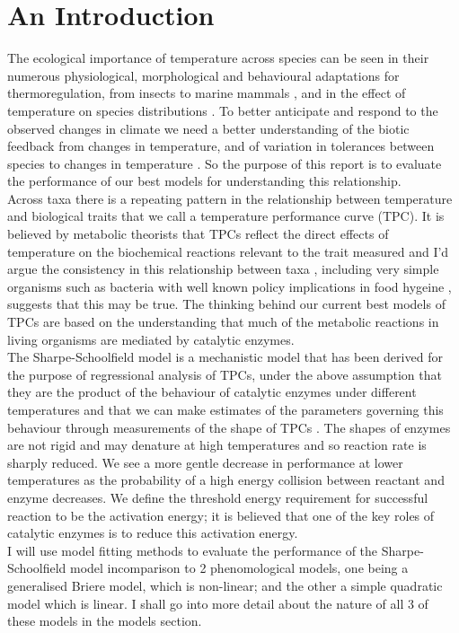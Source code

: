 \documentclass[12pt]{article}
\begin{document}
  \section{An Introduction} 
  The ecological importance of temperature across species can be seen in their numerous physiological, morphological and 
  behavioural adaptations for thermoregulation, from insects to marine mammals \cite{Castellini2018,Heinrich2009}, and in the effect of temperature
  on species distributions \cite{Woodward1988,Buckley}. To better anticipate and respond to the observed changes in climate \cite{RoyalSociety}
  we need a better understanding of the biotic feedback from changes in temperature, and of variation
  in tolerances between species to changes in temperature \cite{Buckley}. So the purpose of this report is to evaluate the performance of our best models
  for understanding this relationship.\\
  Across taxa there is a repeating pattern in the relationship between temperature and biological traits that we call a temperature performance curve (TPC). 
  It is believed by metabolic theorists that TPCs reflect the direct effects 
  of temperature on the biochemical reactions relevant to the trait measured and I'd argue the consistency in this relationship between taxa \cite{Dell2011a}, including 
  very simple organisms such as bacteria with well known policy implications in food hygeine \cite{Zwietering1991b}, suggests that this may be true. 
  The thinking behind our current best models of TPCs are based on the understanding that much of the metabolic reactions in living organisms are 
  mediated by catalytic enzymes. \\
  The Sharpe-Schoolfield model is a mechanistic model that has been derived for the purpose of regressional 
  analysis of TPCs, under the above assumption that they are the product of the behaviour of catalytic enzymes under different temperatures and that we can make 
  estimates of the parameters governing this behaviour through measurements of the shape of TPCs \cite{Schoolfield1981}. The shapes of enzymes are not 
  rigid and may denature at high temperatures and so reaction rate is sharply reduced. We see a more gentle decrease in performance at lower temperatures as the probability of a high energy collision 
  between reactant and enzyme decreases. We define the threshold energy requirement for successful reaction to be the activation energy; it is believed that
  one of the key roles of catalytic enzymes is to reduce this activation energy. \\ 
  I will use model fitting methods to evaluate the performance of the Sharpe-Schoolfield model incomparison to 2 phenomological models, one being a 
  generalised Briere model, which is non-linear; 
  and the other a simple quadratic model which is linear. I shall go into more detail about the nature of all 3 of these models in the models section. \\
\end{document}
